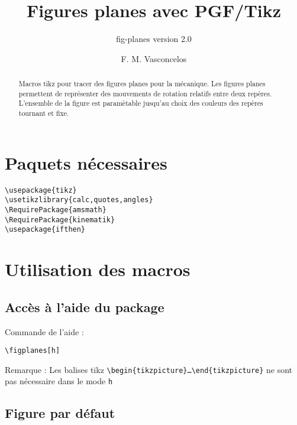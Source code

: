 \documentclass[a4paper,9pt]{article}
\title{Figures planes avec PGF/Tikz}
\subtitle{fig-planes version 2.0}
\author{F. M. Vasconcelos}
\date{}
\begin{document}
\maketitle
\begin{abstract}
Macros tikz pour tracer des figures planes pour la mécanique. Les figures planes
permettent de représenter des mouvements de rotation relatifs entre deux repères.
L'ensemble de la figure est paramètable jusqu'au choix des couleurs des repères 
tournant et fixe.
\end{abstract}

\section{Paquets nécessaires}                                                         
\begin{verbatim}                                                                      
\usepackage{tikz}
\usetikzlibrary{calc,quotes,angles}
\RequirePackage{amsmath}
\RequirePackage{kinematik}
\usepackage{ifthen}
\end{verbatim} 
\section{Utilisation des macros}                                                         
\subsection*{Accès à l'aide du package}

\figplanes[h]

Commande de l'aide :
\begin{verbatim}
\figplanes[h]
\end{verbatim}
Remarque :
Les balises tikz \texttt{\textbackslash begin\{tikzpicture\}\ldots \textbackslash end\{tikzpicture\}} ne 
sont pas nécessaire dans le mode \texttt{h}

\subsection*{Figure par défaut}
\end{document}
